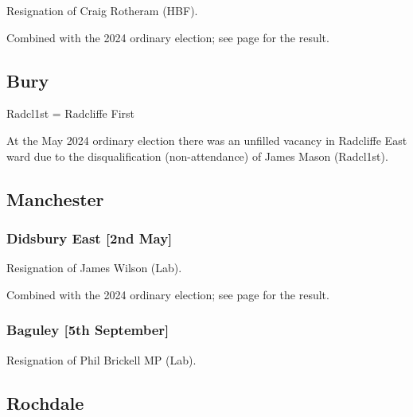 \documentclass[a4paper,openany]{book}
\begin{document}
\begin{resultsiii}

Resignation of Craig Rotheram (HBF).

Combined with the 2024 ordinary election; see page \pageref{HorwichNorthBolton} for the result.

\subsection*{Bury}

Radcl1st = Radcliffe First

At the May 2024 ordinary election there was an unfilled vacancy in Radcliffe East ward due to the disqualification (non-attendance) of James Mason (Radcl1st).%

\subsection*{Manchester}

\subsubsection*{Didsbury East \hspace*{\fill}\nolinebreak[1]%
	\enspace\hspace*{\fill}
	[2nd May]}


Resignation of James Wilson (Lab).

Combined with the 2024 ordinary election; see page \pageref{DidsburyEastManchester} for the result.

\subsubsection*{Baguley \hspace*{\fill}\nolinebreak[1]%
	\enspace\hspace*{\fill}
	[5th September]}


Resignation of Phil Brickell MP (Lab).

\subsection*{Rochdale}


\end{resultsiii}
\end{document}
